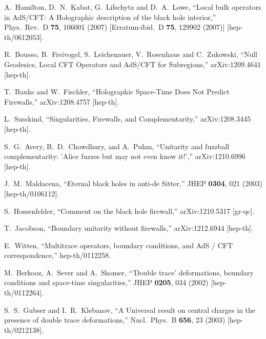 \documentclass[12pt]{article}
\begin{document}
\begin{thebibliography}{99}
  A.~Hamilton, D.~N.~Kabat, G.~Lifschytz and D.~A.~Lowe,
  ``Local bulk operators in AdS/CFT: A Holographic description of the black hole interior,''
  Phys.\ Rev.\ D {\bf 75}, 106001 (2007)
  [Erratum-ibid.\ D {\bf 75}, 129902 (2007)]
  [hep-th/0612053].

  R.~Bousso, B.~Freivogel, S.~Leichenauer, V.~Rosenhaus and C.~Zukowski,
  ``Null Geodesics, Local CFT Operators and AdS/CFT for Subregions,''
  arXiv:1209.4641 [hep-th].

  T.~Banks and W.~Fischler,
  ``Holographic Space-Time Does Not Predict Firewalls,''
  arXiv:1208.4757 [hep-th].

  L.~Susskind,
  ``Singularities, Firewalls, and Complementarity,''
  arXiv:1208.3445 [hep-th].

  S.~G.~Avery, B.~D.~Chowdhury, and A.~Puhm,
  ``Unitarity and fuzzball complementarity: 'Alice fuzzes but may not even know it!',''
  arXiv:1210.6996 [hep-th].

  J.~M.~Maldacena,
  ``Eternal black holes in anti-de Sitter,''
  JHEP {\bf 0304}, 021 (2003)
  [hep-th/0106112].

  S.~Hossenfelder,
  ``Comment on the black hole firewall,''
  arXiv:1210.5317 [gr-qc].

  T.~Jacobson,
  ``Boundary unitarity without firewalls,''
  arXiv:1212.6944 [hep-th].

  E.~Witten,
  ``Multitrace operators, boundary conditions, and AdS / CFT correspondence,''
  hep-th/0112258.


  M.~Berkooz, A.~Sever and A.~Shomer,
  ``'Double trace' deformations, boundary conditions and space-time singularities,''
  JHEP {\bf 0205}, 034 (2002)
  [hep-th/0112264].


  S.~S.~Gubser and I.~R.~Klebanov,
  ``A Universal result on central charges in the presence of double trace deformations,''
  Nucl.\ Phys.\ B {\bf 656}, 23 (2003)
  [hep-th/0212138].



\end{thebibliography}
\end{document}
